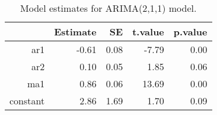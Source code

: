 \begin{table}[ht]
\centering
\begin{tabular}{rrrrr}
  \hline
 & Estimate & SE & t.value & p.value \\ 
  \hline
ar1 & -0.61 & 0.08 & -7.79 & 0.00 \\ 
  ar2 & 0.10 & 0.05 & 1.85 & 0.06 \\ 
  ma1 & 0.86 & 0.06 & 13.69 & 0.00 \\ 
  constant & 2.86 & 1.69 & 1.70 & 0.09 \\ 
   \hline
\end{tabular}
\caption{Model estimates for ARIMA(2,1,1) model.}
\end{table}